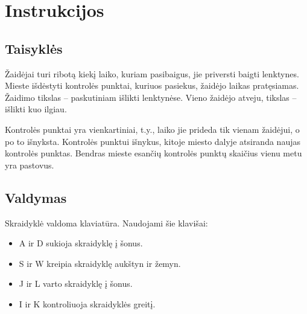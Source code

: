 \section{Instrukcijos}
\subsection{Taisyklės}


Žaidėjai turi ribotą kiekį laiko, kuriam pasibaigus, jie priversti baigti lenktynes.
Mieste išdėstyti kontrolės punktai, kuriuos pasiekus, žaidėjo laikas pratęsiamas.
Žaidimo tikslas -- paskutiniam išlikti lenktynėse.
Vieno žaidėjo atveju, tikslas -- išlikti kuo ilgiau.

Kontrolės punktai yra vienkartiniai, t.y., laiko jie prideda tik vienam žaidėjui, o po to išnyksta.
Kontrolės punktui išnykus, kitoje miesto dalyje atsiranda naujas kontrolės punktas.
Bendras mieste esančių kontrolės punktų skaičius vienu metu yra pastovus.

\subsection{Valdymas}

Skraidyklė valdoma klaviatūra.
Naudojami šie klavišai:
\begin{itemize}
\item A ir D sukioja skraidyklę į šonus.
\item S ir W kreipia skraidyklę aukštyn ir žemyn.
\item J ir L varto skraidyklę į šonus.
\item I ir K kontroliuoja skraidyklės greitį.
\end{itemize}

